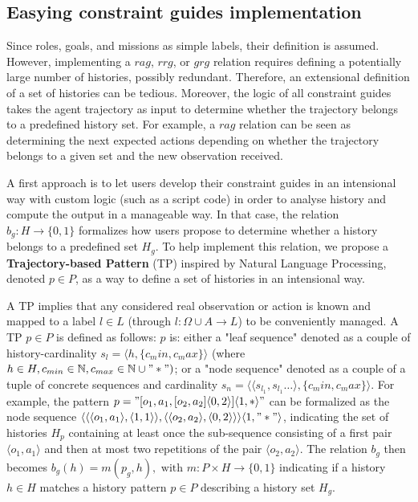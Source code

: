 \documentclass[sigconf]{aamas}
\begin{document}
\subsection{Easying constraint guides implementation}

Since roles, goals, and missions as simple labels, their definition is assumed. However, implementing a $rag$, $rrg$, or $grg$ relation requires defining a potentially large number of histories, possibly redundant. Therefore, an extensional definition of a set of histories can be tedious. Moreover, the logic of all constraint guides takes the agent trajectory as input to determine whether the trajectory belongs to a predefined history set. For example, a $rag$ relation can be seen as determining the next expected actions depending on whether the trajectory belongs to a given set and the new observation received.

A first approach is to let users develop their constraint guides in an intensional way with custom logic (such as a script code) in order to analyse history and compute the output in a manageable way. In that case, the relation $b_g: H \to \{0,1\}$ formalizes how users propose to determine whether a history belongs to a predefined set $H_g$.
To help implement this relation, we propose a \textbf{Trajectory-based Pattern} (TP) inspired by Natural Language Processing, denoted $p \in P$, as a way to define a set of histories in an intensional way.

A TP implies that any considered real observation or action is known and mapped to a label $l \in L$ (through $l: \Omega \cup A \to L$) to be conveniently managed. A TP $p \in P$ is defined as follows: $p$ is: either a "leaf sequence" denoted as a couple of history-cardinality $s_l = \langle h, \{c_min,c_max\}\rangle$ (where $h \in H, c_{min} \in \mathbb{N}, c_{max} \in \mathbb{N} \cup "*")$; or a "node sequence" denoted as a couple of a tuple of concrete sequences and cardinality $s_n = \langle \langle s_{l_1}, s_{l_1}\dots \rangle, \{c_min,c_max\}\rangle$. For example, the pattern $p = \allowbreak "[o_1,a_1,[o_2,a_2]\langle0,2\rangle]\langle1,*\rangle"$ can be formalized as the node sequence $\allowbreak \langle \langle \langle o_1,a_1\rangle,\langle 1,1 \rangle \rangle, \langle \langle o_2,a_2 \rangle, \langle 0,2 \rangle \rangle \rangle \langle 1,"*" \rangle$, indicating the set of histories $H_p$ containing at least once the sub-sequence consisting of a first pair $\langle o_1,a_1\rangle$ and then at most two repetitions of the pair $\langle o_2,a_2 \rangle$.
The relation $b_g$ then becomes $b_g(h) = m(p_g,h), \text{ with } m: P \times H \to \{0,1\}$ indicating if a history $h \in H$ matches a history pattern $p \in P$ describing a history set $H_g$.
\end{document}
